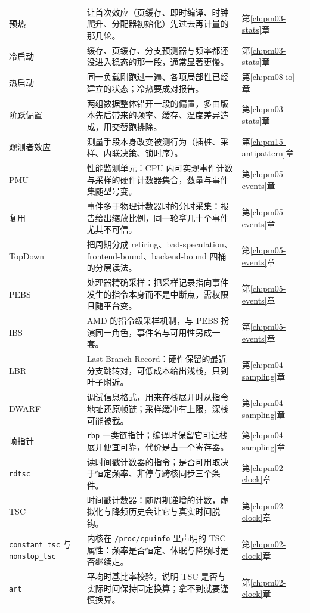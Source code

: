 \documentclass[12pt,a4paper,fontset=fandol]{ctexbook}
\newcommand{\Tp}[1]{\texttt{#1}}
\newcommand{\Bk}{\discretionary{}{}{}}
\newcommand{\Mx}[1]{\textsf{#1}}
\begin{document}
\begin{longtable}{>{\raggedright\arraybackslash}p{}
                  >{\raggedright\arraybackslash}p{}
                  >{\raggedright\arraybackslash}p{}}
预热 & 让首次效应（页缓存、即时编译、时钟爬升、分配器初始化）先过去再计量的那几轮。 & 第\ref{ch:pm03-stats}章 \\
冷启动 & 缓存、页缓存、分支预测器与频率都还没进入稳态的那一段，通常显著更慢。 & 第\ref{ch:pm03-stats}章 \\
热启动 & 同一负载刚跑过一遍、各项局部性已经建立的状态；冷热要成对报告。 & 第\ref{ch:pm08-io}章 \\
阶跃偏置 & 两组数据整体错开一段的偏置，多由版本先后带来的频率、缓存、温度差异造成，用交替跑排除。 & 第\ref{ch:pm03-stats}章 \\
观测者效应 & 测量手段本身改变被测行为（插桩、采样、内联决策、锁时序）。 & 第\ref{ch:pm15-antipattern}章 \\
PMU & 性能监测单元：CPU 内可实现事件计数与采样的硬件计数器集合，数量与事件集随型号变。 & 第\ref{ch:pm05-events}章 \\
复用 & 事件多于物理计数器时的分时采集：报告给出缩放比例，同一轮拿几十个事件尤其不可信。 & 第\ref{ch:pm05-events}章 \\
TopDown & 把周期分成 \Mx{retiring}、\Mx{bad-speculation}、\Mx{frontend-bound}、\Mx{backend-bound} 四桶的分层读法。 & 第\ref{ch:pm05-events}章 \\
PEBS & 处理器精确采样：把采样记录指向事件发生的指令本身而不是中断点，需权限且随平台变。 & 第\ref{ch:pm05-events}章 \\
IBS & AMD 的指令级采样机制，与 PEBS 扮演同一角色，事件名与可用性另成一套。 & 第\ref{ch:pm05-events}章 \\
LBR & Last Branch Record：硬件保留的最近分支跳转对，可低成本给出浅栈，只到叶子附近。 & 第\ref{ch:pm04-sampling}章 \\
DWARF & 调试信息格式，用来在栈展开时从指令地址还原帧链；采样缓冲有上限，深栈可能被截。 & 第\ref{ch:pm04-sampling}章 \\
帧指针 & \Tp{rbp} 一类链指针；编译时保留它可让栈展开便宜可靠，代价是占一个寄存器。 & 第\ref{ch:pm04-sampling}章 \\
\Tp{rdtsc} & 读时间戳计数器的指令；是否可用取决于恒定频率、非停与跨核同步三个条件。 & 第\ref{ch:pm02-clock}章 \\
TSC & 时间戳计数器：随周期递增的计数，虚拟化与降频历史会让它与真实时间脱钩。 & 第\ref{ch:pm02-clock}章 \\
\Tp{constant\_{\Bk}tsc} 与 \Tp{nonstop\_{\Bk}tsc} & 内核在 \Tp{/proc/{\Bk}cpuinfo} 里声明的 TSC 属性：频率是否恒定、休眠与降频时是否继续走。 & 第\ref{ch:pm02-clock}章 \\
\Tp{art} & 平均时基比率校验，说明 TSC 是否与实际时间保持固定换算；拿不到就要谨慎换算。 & 第\ref{ch:pm02-clock}章 \\

\end{longtable}
\end{document}

